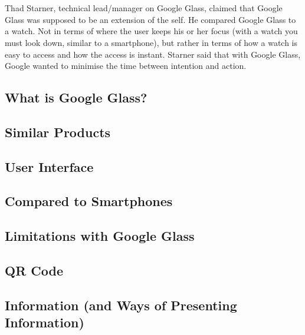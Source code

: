 \\
\\ 
Thad Starner, technical lead/manager on Google Glass, claimed that Google Glass was supposed to be an extension of the self.\cite{6504855} He compared Google Glass to a watch. Not in terms of where the user keeps his or her focus (with a watch you must look down, similar to a smartphone), but rather in terms of how a watch is easy to access and how the access is instant. Starner said that with Google Glass, Google wanted to minimise the time between intention and action. 

\subsection{What is Google Glass?}
\label{subsec:googleglass}


\subsection{Similar Products}
\label{subsec:similarproducts}


\subsection{User Interface}
\label{subsec:userinterface}


\subsection{Compared to Smartphones}
\label{comparedtophones}


\subsection{Limitations with Google Glass}
\label{subsec:limitations}


\subsection{QR Code}
\label{subsec:qrcode}


\subsection{Information (and Ways of Presenting Information)}
\label{subsec:information}


